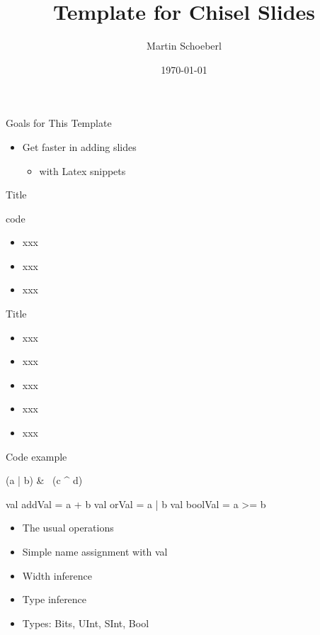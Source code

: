 \documentclass[xcolor=pdflatex,dvipsnames,table]{beamer}
\title{Template for Chisel Slides}
\author{Martin Schoeberl}
\date{\today}
\institute{DTU Compute}
\begin{document}
\begin{frame}
\titlepage
\end{frame}


\begin{frame}[fragile]{Goals for This Template}
\begin{itemize}
\item Get faster in adding slides
\begin{itemize}
\item with Latex snippets
\end{itemize}
\end{itemize}
\end{frame}


\begin{frame}[fragile]{Title}
\begin{chisel}
code
\end{chisel}
\begin{itemize}
\item xxx
\item xxx
\item xxx
\end{itemize}
\end{frame}

\begin{frame}[fragile]{Title}
\begin{itemize}
\item xxx
\item xxx
\item xxx
\item xxx
\item xxx
\end{itemize}
\end{frame}


\begin{frame}[fragile]{Code example}
\begin{chisel}
(a | b) & ~(c ^ d)

val addVal = a + b
val orVal = a | b
val boolVal = a >= b
\end{chisel}
\begin{itemize}
\item The usual operations 
\item Simple name assignment with val
\item Width inference
\item Type inference
\item Types: Bits, UInt, SInt, Bool
\end{itemize}
\end{frame}
\end{document}
